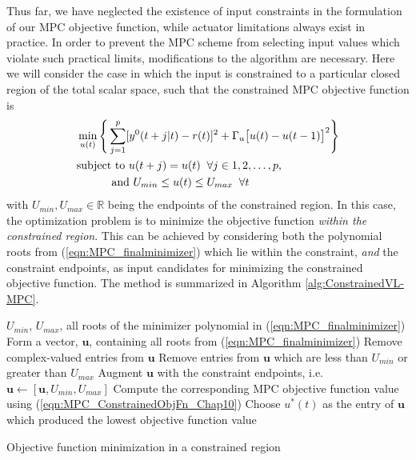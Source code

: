 Thus far, we have neglected the existence of input constraints in the formulation of our MPC objective function, while actuator limitations always exist in practice. In order to prevent the MPC scheme from selecting input values which violate such practical limits, modifications to the algorithm are necessary. Here we will consider the case in which the input is constrained to a particular closed region of the total scalar space, such that the constrained MPC objective function is
\begin{align}
\label{eqn:MPC_ConstrainedObjFn_Chap10}
&\min_{u(t)} \Bigg\{ \sum_{j=1}^{p} [y^0(t+j|t) - r(t)]^2  + \Gamma_u \big[ u(t) - u(t-1) \big]^2 \Bigg\} \\
&\textrm{subject to } u(t+j) = u(t) \; \; \forall j \in 1,2,\hdots,p,  \nonumber \\
& \hspace{11mm} \textrm{and } U_{min} \leq u(t) \leq U_{max} \; \; \forall t \nonumber
\end{align}
with $U_{min},U_{max} \in \mathbb{R}$ being the endpoints of the constrained region. In this case, the optimization problem is to minimize the objective function \emph{within the constrained region}. This can be achieved by considering both the polynomial roots from (\ref{eqn:MPC_finalminimizer}) which lie within the constraint, \emph{and} the constraint endpoints, as input candidates for minimizing the constrained objective function. The method is summarized in Algorithm \ref{alg:ConstrainedVL-MPC}.

\begin{algorithm}[h]
\begin{algorithmic}[1]
\Require $U_{min}$, $U_{max}$, all roots of the minimizer polynomial in (\ref{eqn:MPC_finalminimizer})
\State Form a vector, $\mathbf{u}$, containing all roots from (\ref{eqn:MPC_finalminimizer})
\State Remove complex-valued entries from $\mathbf{u}$
\State Remove entries from $\mathbf{u}$ which are less than $U_{min}$ or greater than $U_{max}$
\State Augment $\mathbf{u}$ with the constraint endpoints, i.e. $\mathbf{u} \gets [\mathbf{u}, U_{min}, U_{max}]$
\State Compute the corresponding MPC objective function value using (\ref{eqn:MPC_ConstrainedObjFn_Chap10}) 
\EndFor
\State Choose $u^*(t)$ as the entry of $\mathbf{u}$ which produced the lowest objective function value
\end{algorithmic}
\caption{Objective function minimization in a constrained region}
\label{alg:ConstrainedVL-MPC}
\end{algorithm}

